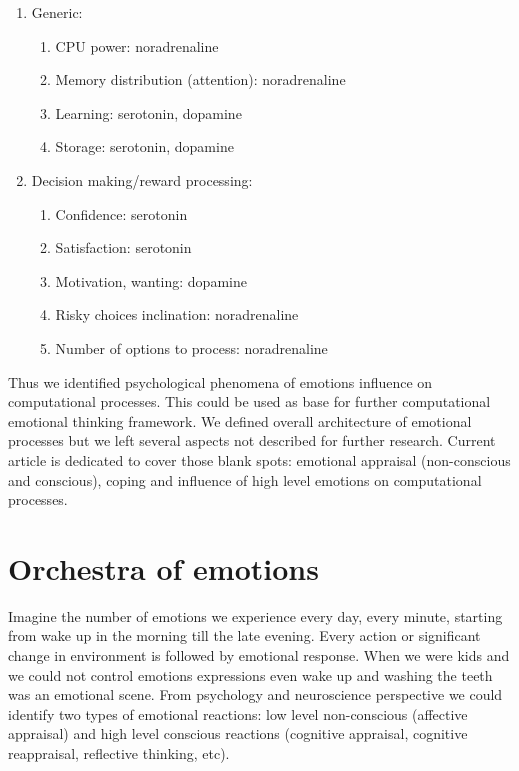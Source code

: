 \begin{enumerate}
 \item  Generic:
 \begin{enumerate}
  \item  CPU power: noradrenaline
  \item  Memory distribution (attention): noradrenaline
  \item  Learning: serotonin, dopamine
  \item  Storage: serotonin, dopamine
 \end{enumerate}
 \item  Decision making/reward processing:
 \begin{enumerate}
  \item  Confidence: serotonin
  \item  Satisfaction: serotonin
  \item  Motivation, wanting: dopamine
  \item  Risky choices inclination: noradrenaline
  \item  Number of options to process: noradrenaline
 \end{enumerate}
\end{enumerate}

Thus we identified psychological phenomena of emotions influence on computational processes. This could be used as base for further computational emotional thinking framework. We defined overall architecture of emotional processes but we left several aspects not described for further research. Current article is dedicated to cover those blank spots: emotional appraisal (non-conscious and conscious), coping and influence of high level emotions on computational processes.

\section{Orchestra of emotions}

Imagine the number of emotions we experience every day, every minute, starting from wake up in the morning till the late evening. Every action or significant change in environment is followed by emotional response. When we were kids and we could not control emotions expressions even wake up and washing the teeth was an emotional scene. From psychology and neuroscience perspective \cite{emotionsbraintorobot, neuromodulatory, natureofemotions, primer_affect_psychology} we could identify two types of emotional reactions: low level non-conscious (affective appraisal) and high level conscious reactions (cognitive appraisal, cognitive reappraisal, reflective thinking, etc).

